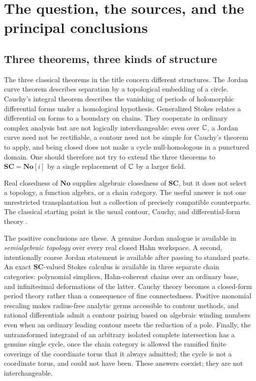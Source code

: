 \documentclass[11pt,letterpaper]{article}
\theoremstyle{definition}
\theoremstyle{remark}
\newcommand{\No}{\mathbf{No}}\newcommand{\SC}{\mathbf{SC}}
\numberwithin{equation}{section}
\begin{document}
\setcounter{page}{2}
\begingroup\small\setlength{\parskip}{0pt}\tableofcontents\endgroup
\clearpage
{}
\hypersetup{pageanchor=true}

\section{The question, the sources, and the principal conclusions}
\label{contours:sec:intro}

\subsection{Three theorems, three kinds of structure}
The three classical theorems in the title concern different structures. The
Jordan curve theorem describes separation by a topological embedding of a circle.
Cauchy's integral theorem describes the vanishing of periods of holomorphic
differential forms under a homological hypothesis. Generalized Stokes relates a
differential on forms to a boundary on chains. They cooperate in ordinary complex
analysis but are not logically interchangeable: even over $\mathbb C$, a Jordan curve
need not be rectifiable, a contour need not be simple for Cauchy's theorem to
apply, and being closed does not make a cycle null-homologous in a punctured
domain. One should therefore not try to extend the three theorems to
$\SC=\No[i]$ by a single replacement of $\mathbb C$ by a larger field.

Real closedness of $\No$ supplies algebraic closedness of $\SC$, but it does not
select a topology, a function algebra, or a chain category. The useful answer is
not one unrestricted transplantation but a collection of precisely compatible
counterparts. The classical starting point is the usual contour, Cauchy, and
differential-form theory \cite{Ahlfors,Spivak,Lee}.

The positive conclusions are these. A genuine Jordan analogue is available in
\emph{semialgebraic topology} over every real closed Hahn workspace. A second,
intentionally coarse Jordan statement is available after passing to standard
parts. An exact $\SC$-valued Stokes calculus is available in three separate chain
categories: polynomial simplices, Hahn-coherent chains over an ordinary base, and
infinitesimal deformations of the latter. Cauchy theory becomes a closed-form
period theory rather than a consequence of fine connectedness. Positive
monomial rescaling makes radius-free analytic germs accessible to contour methods,
and rational differentials admit a contour pairing based on algebraic winding
numbers even when an ordinary leading contour meets the reduction of a pole.
Finally, the untransformed integrand of an arbitrary isolated complete
intersection has a genuine single cycle, once the chain category is allowed the
ramified finite coverings of the coordinate torus that it always admitted; the
cycle is not a coordinate torus, and could not have been.
These answers coexist; they are not interchangeable.
\end{document}

